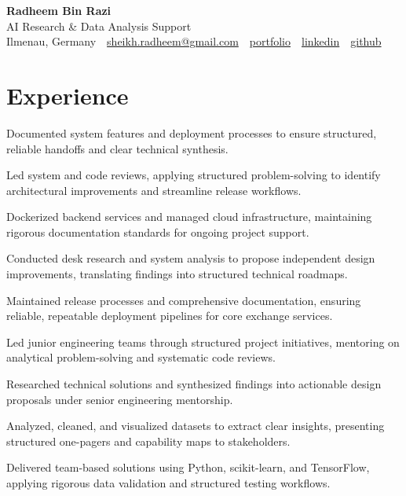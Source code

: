 \documentclass[11pt,a4paper]{resume}
\makeatletter
\newcommand{\Portfolio}{https://radheem.github.io/my-cv}
\newcommand{\PortfolioText}{portfolio}
\newcommand{\GitHub}{https://github.com/radheem}
\newcommand{\LinkedIn}{https://www.linkedin.com/in/radheem-razi}
\newcommand{\Email}{sheikh.radheem@gmail.com}
\makeatother
\begin{document}
\begin{center}
  {\huge\bfseries Radheem Bin Razi}\\[3pt]
  {\large AI Research \& Data Analysis Support}\\[6pt]
  \small
  Ilmenau, Germany \,\textbar\,
  \href{mailto:\Email}{\Email} \,\textbar\,
  \href{\Portfolio}{\PortfolioText} \,\textbar\,
  \href{\LinkedIn}{linkedin} \,\textbar\,
  \href{\GitHub}{github}
\end{center}
\vspace{2pt}

\section{Experience}

\bullets
  \item Documented system features and deployment processes to ensure structured, reliable handoffs and clear technical synthesis.
  \item Led system and code reviews, applying structured problem-solving to identify architectural improvements and streamline release workflows.
  \item Dockerized backend services and managed cloud infrastructure, maintaining rigorous documentation standards for ongoing project support.
\bulletsend
\vspace{3pt}
\bullets
  \item Conducted desk research and system analysis to propose independent design improvements, translating findings into structured technical roadmaps.
  \item Maintained release processes and comprehensive documentation, ensuring reliable, repeatable deployment pipelines for core exchange services.
  \item Led junior engineering teams through structured project initiatives, mentoring on analytical problem-solving and systematic code reviews.
\bulletsend
\vspace{3pt}
\bullets
  \item Researched technical solutions and synthesized findings into actionable design proposals under senior engineering mentorship.
  \item Analyzed, cleaned, and visualized datasets to extract clear insights, presenting structured one-pagers and capability maps to stakeholders.
  \item Delivered team-based solutions using Python, scikit-learn, and TensorFlow, applying rigorous data validation and structured testing workflows.
\bulletsend
\vspace{3pt}
\end{document}
